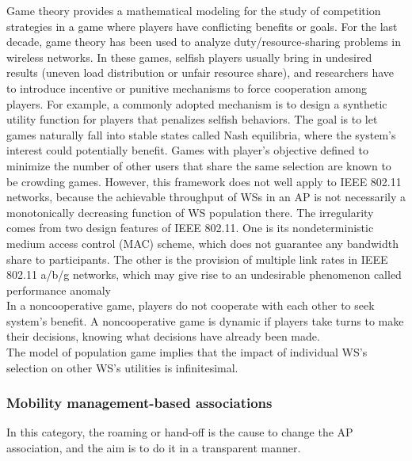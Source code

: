 \documentclass[journal,transmag]{IEEEtran}
\begin{document}
Game theory provides a mathematical modeling for the study of competition strategies in a game where players have conflicting benefits or goals. For the last decade, game theory has been used to analyze duty/resource-sharing problems in wireless networks. In these games, selfish players usually bring in undesired results (uneven load distribution or unfair resource share), and researchers have to introduce incentive or punitive mechanisms to force cooperation among players. For example, a commonly adopted mechanism is to design a synthetic utility function for
players that penalizes selfish behaviors. The goal is to let games naturally fall into stable states called Nash equilibria, where the system’s interest could potentially benefit. Games with
player’s objective defined to minimize the number of other users that share the same selection are known to be crowding games. However, this framework does not well apply to IEEE 802.11 networks, because the achievable throughput of WSs in an AP is not necessarily a monotonically decreasing function of WS population there. The irregularity comes from two design features of IEEE 802.11. One is its nondeterministic medium access control (MAC) scheme, which does not guarantee any bandwidth share to participants. The other is the provision of multiple link rates
in IEEE 802.11 a/b/g networks, which may give rise to an undesirable phenomenon called performance anomaly \cite{11stability_fairness_APselection_game} \\
In a noncooperative game, players do not cooperate with each other to seek system’s benefit. A noncooperative game is dynamic if players take turns to make their decisions, knowing what decisions have already been made. \cite{11stability_fairness_APselection_game} \\
The model of population game implies that the impact of individual WS’s selection on other
WS’s utilities is infinitesimal. \cite{11stability_fairness_APselection_game} \\




\subsubsection{Mobility management-based associations}
In this category, the roaming or hand-off is the cause to change the AP association, and the aim is to do it in a transparent manner. \\ 
\end{document}
